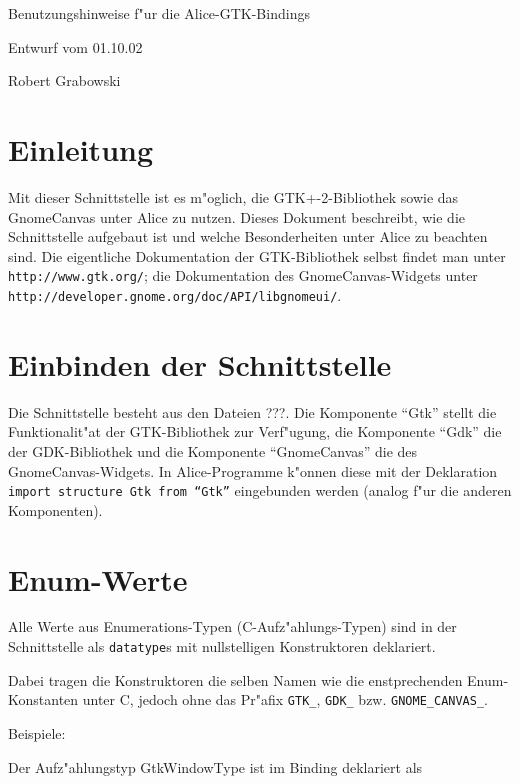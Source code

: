 \documentclass{article}
\begin{document}
\begin{center}
\begin{huge}Benutzungshinweise f"ur die Alice-GTK-Bindings\end{huge}

Entwurf vom 01.10.02

Robert Grabowski

\end{center}



\section{Einleitung}
Mit dieser Schnittstelle ist es m"oglich, die GTK+-2-Bibliothek sowie das
GnomeCanvas unter Alice zu nutzen. Dieses Dokument beschreibt, wie die
Schnittstelle aufgebaut ist und welche Besonderheiten unter Alice zu beachten
sind. Die eigentliche Dokumentation der GTK-Bibliothek selbst findet man unter
\texttt{http://www.gtk.org/}; die Dokumentation des GnomeCanvas-Widgets unter
\texttt{http://developer.gnome.org/doc/API/libgnomeui/}.



\section{Einbinden der Schnittstelle}
Die Schnittstelle besteht aus den Dateien ???. Die Komponente ``Gtk'' stellt
die Funktionalit"at der GTK-Bibliothek zur Verf"ugung, die Komponente ``Gdk''
die der GDK-Bibliothek und die Komponente ``GnomeCanvas'' die des 
GnomeCanvas-Widgets. In Alice-Programme k"onnen diese mit der Deklaration
\texttt{import structure Gtk from ``Gtk''} eingebunden werden (analog f"ur
die anderen Komponenten).



\section{Enum-Werte}

Alle Werte aus Enumerations-Typen (C-Aufz"ahlungs-Typen) sind in der
Schnittstelle als \texttt{datatype}s mit nullstelligen Konstruktoren
deklariert.

Dabei tragen die Konstruktoren die selben Namen wie die enstprechenden
Enum-Konstanten unter C, jedoch ohne das Pr"afix \texttt{GTK\_},
\texttt{GDK\_} bzw. \texttt{GNOME\_CANVAS\_}. 

Beispiele:

Der Aufz"ahlungstyp GtkWindowType ist im Binding deklariert als
\end{document}
